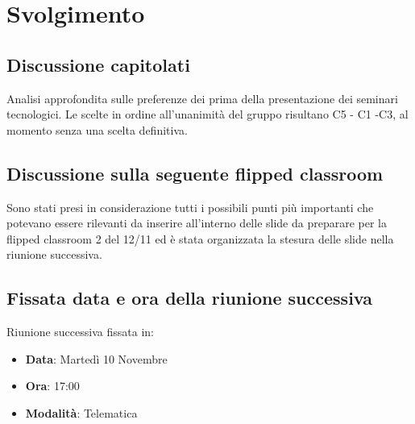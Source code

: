 \documentclass[]{article}
\begin{document}
	\newpage

	\section{Svolgimento}
		\subsection{Discussione capitolati}
		 Analisi approfondita sulle preferenze dei  prima della presentazione dei seminari tecnologici. Le scelte in ordine all'unanimità del gruppo risultano C5 - C1 -C3, al momento senza una scelta definitiva.
	
		\subsection{Discussione sulla seguente flipped classroom}
		Sono stati presi in considerazione tutti i possibili punti più importanti che potevano essere rilevanti da inserire all'interno delle slide da preparare per la flipped classroom 2  del 12/11 ed è stata organizzata la stesura delle slide nella riunione successiva.
		
		\subsection{Fissata data e ora della riunione successiva}
		Riunione successiva fissata in:
		\begin{itemize}
			\item \textbf{Data}: Martedì 10 Novembre
			\item \textbf{Ora}: 17:00
			\item \textbf{Modalità}: Telematica
		\end{itemize}
\end{document}

